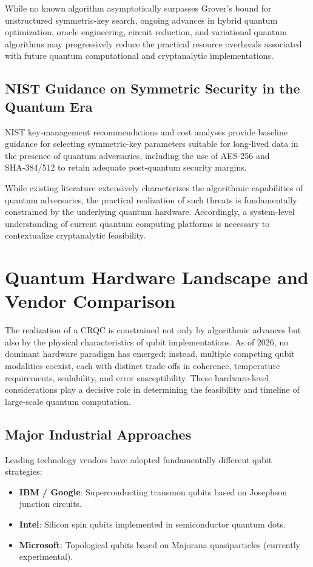 \documentclass[11pt,a4paper]{article}
\begin{document}
While no known algorithm asymptotically surpasses Grover’s bound for unstructured symmetric-key search, ongoing advances in hybrid quantum optimization, oracle engineering, circuit reduction, and variational quantum algorithms may progressively reduce the practical resource overheads associated with future quantum computational and cryptanalytic implementations.\cite{ali2025}
\subsection{NIST Guidance on Symmetric Security in the Quantum Era}
NIST key‑management recommendations and cost analyses provide baseline guidance for selecting symmetric-key parameters suitable for long‑lived
data in the presence of quantum adversaries, including the use of AES‑256 and SHA‑384/512 to retain adequate post‑quantum security margins.\cite{sp80057}

While existing literature extensively characterizes the algorithmic capabilities of quantum adversaries, the practical realization of such threats is fundamentally constrained by the underlying quantum hardware. Accordingly, a system-level understanding of current quantum computing platforms is necessary to contextualize cryptanalytic feasibility.

\section{Quantum Hardware Landscape and Vendor Comparison}

The realization of a CRQC is constrained not only by algorithmic advances but also by the physical characteristics of qubit implementations. As of 2026, no dominant hardware paradigm has emerged; instead, multiple competing qubit modalities coexist, each with distinct trade-offs in coherence, temperature requirements, scalability, and error susceptibility. These hardware-level considerations play a decisive role in determining the feasibility and timeline of large-scale quantum computation.

\subsection{Major Industrial Approaches}

Leading technology vendors have adopted fundamentally different qubit strategies\cite{kjaergaard2020,vandersypen2017,aasen2016}:

\begin{itemize}
    \item \textbf{IBM / Google}: Superconducting transmon qubits based on Josephson junction circuits.
    \item \textbf{Intel}: Silicon spin qubits implemented in semiconductor quantum dots.
    \item \textbf{Microsoft}: Topological qubits based on Majorana quasiparticles (currently experimental).
\end{itemize}
\end{document}
